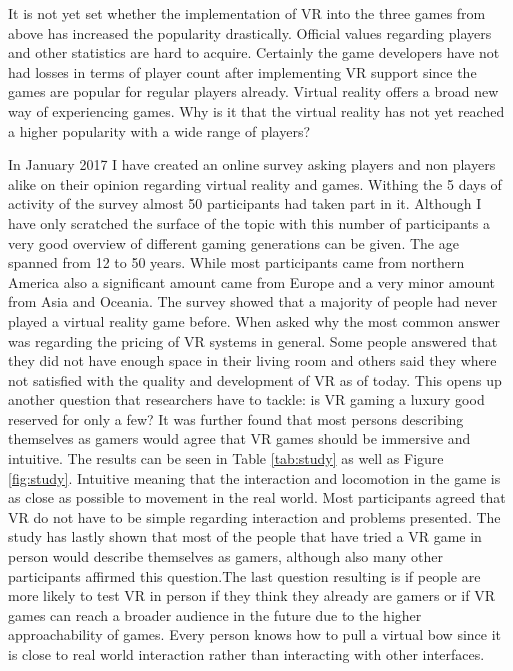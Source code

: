 It is not yet set whether the implementation of VR into the three games from above has increased the popularity drastically. Official values regarding players and other statistics are hard to acquire. Certainly the game developers have not had losses in terms of player count after implementing VR support since the games are popular for regular players already. \newline
Virtual reality offers a broad new way of experiencing games. Why is it that the virtual reality has not yet reached a higher popularity with a wide range of players?

\divider

In January 2017 I have created an online survey asking players and non players alike on their opinion regarding virtual reality and games. Withing the 5 days of activity of the survey almost 50 participants had taken part in it. Although I have only scratched the surface of the topic with this number of participants a very good overview of different gaming generations can be given. The age spanned from 12 to 50 years. While most participants came from northern America also a significant amount came from Europe and a very minor amount from Asia and Oceania. \newline
The survey showed that a majority of people had never played a virtual reality game before. When asked why the most common answer was regarding the pricing of VR systems in general. Some people answered that they did not have enough space in their living room and others said they where not satisfied with the quality and development of VR as of today. This opens up another question that researchers have to tackle: is VR gaming a luxury good reserved for only a few? \newline
It was further found that most persons describing themselves as gamers would agree that VR games should be immersive and intuitive. The results can be seen in Table \ref{tab:study} as well as Figure \ref*{fig:study}. Intuitive meaning that the interaction and locomotion in the game is as close as possible to movement in the real world. Most participants agreed that VR do not have to be simple regarding interaction and problems presented. \newline 
The study has lastly shown that most of the people that have tried a VR game in person would describe themselves as gamers, although also many other participants affirmed this question.\newline The last question resulting is if people are more likely to test VR in person if they think they already are gamers or if VR games can reach a broader audience in the future due to the higher approachability of games. Every person knows how to pull a virtual bow since it is close to real world interaction rather than interacting with other interfaces. 

